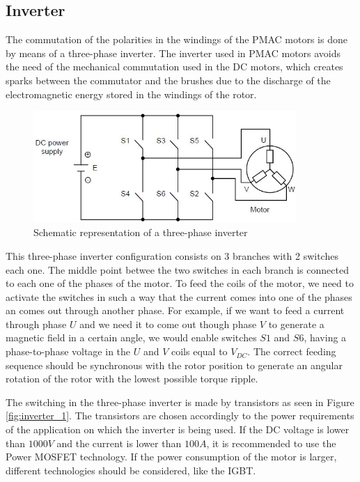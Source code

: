 \subsection{Inverter}\label{subsection:inverter}

The commutation of the polarities in the windings of the \ac{PMAC} motors is done by means of a three-phase inverter. The inverter used in \ac{PMAC} motors avoids the need of the mechanical commutation used in the \ac{DC} motors, which creates sparks between the commutator and the brushes due to the discharge of the electromagnetic energy stored in the windings of the rotor. 

\begin{figure}[htbp]
\centering
\includegraphics[width=10cm]{Images/inverter_2.png} 
\caption[Simple Three-Phase Inverter]{Schematic representation of a three-phase inverter}
\label{fig:inverter_2}
\end{figure}

This three-phase inverter configuration consists on 3 branches with 2 switches each one. The middle point betwee the two switches in each branch is connected to each one of the phases of the motor. To feed the coils of the motor, we need to activate the switches in such a way that the current comes into one of the phases an comes out through another phase. For example, if we want to feed a current through phase $U$ and we need it to come out though phase $V$ to generate a magnetic field in a certain angle, we would enable switches $S1$ and $S6$, having a phase-to-phase voltage in the $U$ and $V$ coils equal to $V_{DC}$. The correct feeding sequence should be synchronous with the rotor position to generate an angular rotation of the rotor with the lowest possible torque ripple.

The switching in the three-phase inverter is made by transistors as seen in Figure \ref{fig:inverter_1}. The transistors are chosen accordingly to the power requirements of the application on which the inverter is being used. If the \ac{DC} voltage is lower than $1000 V$ and the current is lower than $100 A$, it is recommended to use the Power \acf{MOSFET} technology. If the power consumption of the motor is larger, different technologies should be considered, like the \acf{IGBT}.

